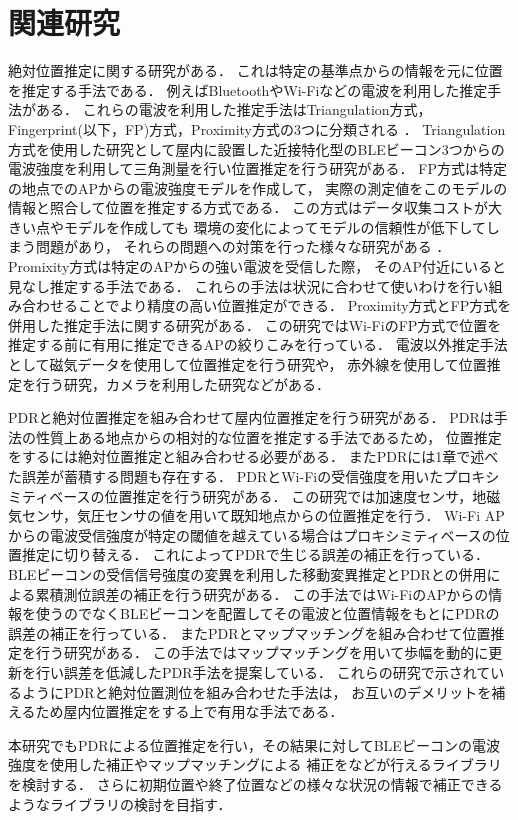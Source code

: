 

\section{関連研究}
絶対位置推定に関する研究がある．
これは特定の基準点からの情報を元に位置を推定する手法である．
例えばBluetoothやWi-Fiなどの電波を利用した推定手法がある．
これらの電波を利用した推定手法はTriangulation方式，Fingerprint(以下，FP)方式，Proximity方式の3つに分類される
\cite{wireless-lan-summary}．
Triangulation方式を使用した研究として屋内に設置した近接特化型のBLEビーコン3つからの電波強度を利用して三角測量を行い位置推定を行う研究がある．\cite{ble-indoor}\cite{ble-tandem}\cite{triangulation-kalman}
FP方式は特定の地点でのAPからの電波強度モデルを作成して，
実際の測定値をこのモデルの情報と照合して位置を推定する方式である．
この方式はデータ収集コストが大きい点やモデルを作成しても
環境の変化によってモデルの信頼性が低下してしまう問題があり，
それらの問題への対策を行った様々な研究がある
\cite{gaussian-mixture-model}
\cite{wireless-lan-cost-reduction}
\cite{fingerprint-auto-update}
\cite{wi-fi-fingerprint-domain}．
Promixity方式は特定のAPからの強い電波を受信した際，
そのAP付近にいると見なし推定する手法である．
これらの手法は状況に合わせて使いわけを行い組み合わせることでより精度の高い位置推定ができる．
Proximity方式とFP方式を併用した推定手法に関する研究がある\cite{proximity-fingerprint}．
この研究ではWi-FiのFP方式で位置を推定する前に有用に推定できるAPの絞りこみを行っている．
電波以外推定手法として磁気データを使用して位置推定を行う研究\cite{pdr-mag}や，
赤外線を使用して位置推定を行う研究\cite{infrared}，カメラを利用した研究\cite{camera}などがある．

PDRと絶対位置推定を組み合わせて屋内位置推定を行う研究がある．
PDRは手法の性質上ある地点からの相対的な位置を推定する手法であるため，
位置推定をするには絶対位置推定と組み合わせる必要がある．
またPDRには1章で述べた誤差が蓄積する問題も存在する．
PDRとWi-Fiの受信強度を用いたプロキシミティベースの位置推定を行う研究\cite{pdr-wifi}がある．
この研究では加速度センサ，地磁気センサ，気圧センサの値を用いて既知地点からの位置推定を行う．
Wi-Fi APからの電波受信強度が特定の閾値を越えている場合はプロキシミティベースの位置推定に切り替える．
これによってPDRで生じる誤差の補正を行っている．
BLEビーコンの受信信号強度の変異を利用した移動変異推定とPDRとの併用による累積測位誤差の補正を行う研究\cite{pdr-ble}がある．
この手法ではWi-FiのAPからの情報を使うのでなくBLEビーコンを配置してその電波と位置情報をもとにPDRの誤差の補正を行っている．
またPDRとマップマッチングを組み合わせて位置推定を行う研究\cite{pdr-map}がある．
この手法ではマップマッチングを用いて歩幅を動的に更新を行い誤差を低減したPDR手法を提案している．
これらの研究で示されているようにPDRと絶対位置測位を組み合わせた手法は，
お互いのデメリットを補えるため屋内位置推定をする上で有用な手法である．

本研究でもPDRによる位置推定を行い，その結果に対してBLEビーコンの電波強度を使用した補正やマップマッチングによる
補正をなどが行えるライブラリを検討する．
さらに初期位置や終了位置などの様々な状況の情報で補正できるようなライブラリの検討を目指す．
